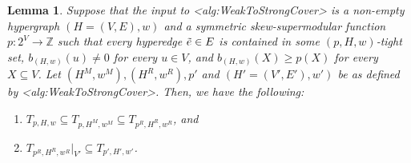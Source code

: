 \documentclass{article}
\def\Cref#1{<#1>}%
\newtheorem{lemma}{Lemma}[section]
\newcommand{\tightSetFamily}[1]{\ensuremath{T_{#1}}\xspace}
\newcommand{\maximalTightSetContainingHyperedge}[1]{\ensuremath{\tau_{#1}}\xspace}
\providecommand{\Z}{\mathbb{Z}}
\begin{document}
\begin{lemma}\label{lem:WeakToStrongCover:TightSetFamiliesDuringAlgorithm}
Suppose that the input to \Cref{alg:WeakToStrongCover} is a non-empty hypergraph $(H = (V, E), w)$ and a symmetric skew-supermodular function $p:2^V\rightarrow \Z$ %
such that every hyperedge $\Tilde{e} \in E$ is contained in some $(p, H, w)$-tight set, $b_{(H,w)}(u) \not = 0$ for every $u \in V$, and $b_{(H,w)}(X) \geq p(X)$ for every $X \subseteq V$. 
Let $(H^M, w^M), (H^R, w^R), p'$ 
and $(H' = (V', E'), w')$ be as defined by \Cref{alg:WeakToStrongCover}.
Then, we have the following:
     \begin{enumerate}
        \item $\tightSetFamily{p, H, w} \subseteq \tightSetFamily{p, H^M, w^M} \subseteq \tightSetFamily{p^R, H^R, w^R}$, and 
        \item $\tightSetFamily{p^R, H^R, w^R}|_{V'} \subseteq \tightSetFamily{p', H', w'}$.
    \end{enumerate}
\end{lemma}
\end{document}
